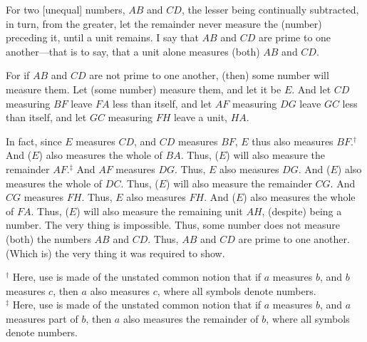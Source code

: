 \begin{Parallel}{}{}
{\epsfysize=1.8in
\centerline{}

For  two [unequal] numbers, $AB$ and $CD$, the lesser being continually
subtracted, in turn, from the greater, let the remainder never measure the (number) preceding it, until a unit remains. I say that $AB$ and
$CD$ are prime to one another---that is to say, that a unit alone measures
(both) $AB$ and $CD$.

For if $AB$ and $CD$ are not prime to one another, (then) some number will measure
 them. Let (some number) measure  them, and let it be $E$. And let $CD$ measuring $BF$ leave $FA$
less than itself, and let $AF$ measuring $DG$ leave $GC$ less than itself, and 
let $GC$ measuring $FH$ leave a unit, $HA$.

In fact, since $E$ measures $CD$, and $CD$ measures $BF$, $E$ thus also measures
$BF$.$^\dag$ 
And ($E$) also measures the whole of $BA$. Thus, ($E$) will also measure the
remainder $AF$.$^\ddag$  And $AF$ measures $DG$. Thus, $E$ also
measures $DG$. And ($E$) also measures the whole of $DC$. Thus, ($E$) will
also measure the remainder $CG$. And $CG$ measures $FH$. Thus, $E$ also measures $FH$. And ($E$) also measures the whole of $FA$. Thus, ($E$) will also measure the remaining unit $AH$, (despite) being a number. The very thing is impossible.
Thus, some number does not measure (both) the numbers $AB$ and $CD$.
Thus, $AB$ and $CD$ are prime to one another. (Which is) the very thing it
was required to show.}
\end{Parallel}
{\footnotesize\noindent$^\dag$ Here, use is made of the unstated common notion that if
$a$ measures $b$, and $b$ measures $c$, then $a$ also measures $c$,
where all symbols denote numbers.\\[0.5ex]
$^\ddag$ Here, use is made of the unstated common notion
that if $a$ measures $b$, and $a$ measures part of $b$, then $a$
also measures the remainder of $b$, where all
symbols denote numbers.}

